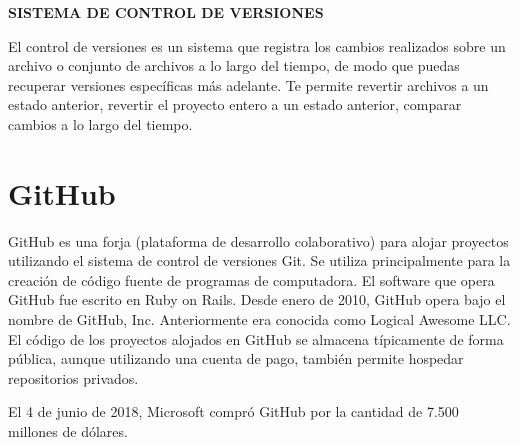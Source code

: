 
\vspace*{0.1in}
\begin{Large}
\textbf{SISTEMA DE CONTROL DE VERSIONES} \\
\end{Large}

\vspace*{0.1in}
\begin{large}
 El control de versiones es un sistema que registra los cambios realizados sobre un archivo o conjunto de archivos a lo largo del tiempo, de modo que puedas recuperar versiones específicas más adelante. Te permite revertir archivos a un estado anterior, revertir el proyecto entero a un estado anterior, comparar cambios a lo largo del tiempo.\\
\end{large}

\section{GitHub} 
GitHub es una forja (plataforma de desarrollo colaborativo) para alojar proyectos utilizando el sistema de control de versiones Git. Se utiliza principalmente para la creación de código fuente de programas de computadora. El software que opera GitHub fue escrito en Ruby on Rails. Desde enero de 2010, GitHub opera bajo el nombre de GitHub, Inc. Anteriormente era conocida como Logical Awesome LLC. El código de los proyectos alojados en GitHub se almacena típicamente de forma pública, aunque utilizando una cuenta de pago, también permite hospedar repositorios privados.

El 4 de junio de 2018, Microsoft compró GitHub por la cantidad de 7.500 millones de dólares.

